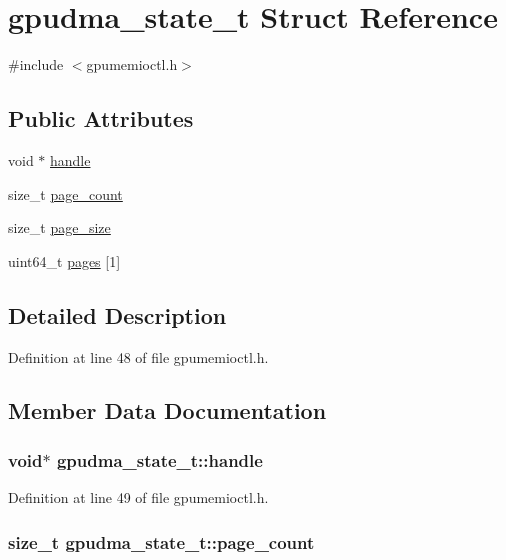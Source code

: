 \hypertarget{structgpudma__state__t}{
\section{gpudma\_\-state\_\-t Struct Reference}
\label{structgpudma__state__t}
}


{\ttfamily \#include $<$gpumemioctl.h$>$}\subsection*{Public Attributes}
\begin{DoxyCompactItemize}
\item 
void $\ast$ \hyperlink{structgpudma__state__t_a6a424759c2617a6e098369d99c780f08}{handle}
\item 
size\_\-t \hyperlink{structgpudma__state__t_a9c5c7a8c240e9baec5e666f8081417f2}{page\_\-count}
\item 
size\_\-t \hyperlink{structgpudma__state__t_a9c5a9f537eb39d78e3505ca858a14aaf}{page\_\-size}
\item 
uint64\_\-t \hyperlink{structgpudma__state__t_a7d45e0f5c232b286ca20c0a5f3e0d032}{pages} \mbox{[}1\mbox{]}
\end{DoxyCompactItemize}


\subsection{Detailed Description}


Definition at line 48 of file gpumemioctl.h.

\subsection{Member Data Documentation}
\hypertarget{structgpudma__state__t_a6a424759c2617a6e098369d99c780f08}{
\subsubsection[{handle}]{\setlength{\rightskip}{0pt plus 5cm}void$\ast$ {\bf gpudma\_\-state\_\-t::handle}}}
\label{structgpudma__state__t_a6a424759c2617a6e098369d99c780f08}


Definition at line 49 of file gpumemioctl.h.\hypertarget{structgpudma__state__t_a9c5c7a8c240e9baec5e666f8081417f2}{
\subsubsection[{page\_\-count}]{\setlength{\rightskip}{0pt plus 5cm}size\_\-t {\bf gpudma\_\-state\_\-t::page\_\-count}}}
\label{structgpudma__state__t_a9c5c7a8c240e9baec5e666f8081417f2}


